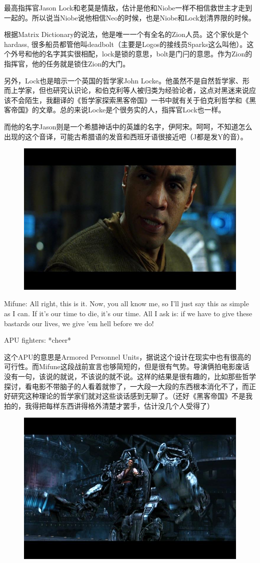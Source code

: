 \documentclass[UTF8]{ctexart}
\newenvironment{myquote}{\color{green} \setlength{\leftskip}{6em} \setlength{\rightskip}{4em} \setlength{\parindent}{-2em}}{\par}
\begin{document}
最高指挥官Jason Lock和老莫是情敌，估计是他和Niobe一样不相信救世主才走到一起的。所以说当Niobe说他相信Neo的时候，也是Niobe和Lock划清界限的时候。

根据Matrix Dictionary的说法，他是唯一一个有全名的Zion人员。这个家伙是个hardass, 很多船员都管他叫deadbolt（主要是Logos的接线员Sparks这么叫他）。这个外号和他的名字其实很相配，lock是锁的意思，bolt是门闩的意思。作为Zion的指挥官，他的任务就是锁住Zion的大门。

另外，Lock也是暗示一个英国的哲学家John Locke。他虽然不是自然哲学家、形而上学家，但也研究认识论，和伯克利等人被归类为经验论者，这点对黑迷来说应该不会陌生，我翻译的《哲学家探索黑客帝国》一书中就有关于伯克利哲学和《黑客帝国》的文章。总的来说Locke是个很务实的人，指挥官Lock也一样。

而他的名字Jason则是一个希腊神话中的英雄的名字，伊阿宋。呵呵，不知道怎么出现的这个音译，可能古希腊语的发音和西班牙语很接近吧（J都是发Y的音）。

\begin{figure}[htb]
\centering
\includegraphics[width=0.5\linewidth]{fig/5fe264383ee43a2397ddd8f2.jpg}
\end{figure}

\begin{myquote}
Mifune: All right, this is it. Now, you all know me, so I'll just say this as simple as I can. If it's our time to die, it's our time. All I ask is: if we have to give these bastards our lives, we give 'em hell before we do!

APU fighters: *cheer*
\end{myquote}

这个APU的意思是Armored Personnel Units，据说这个设计在现实中也有很高的可行性。而Mifune这段战前宣言也够简短的，但是很有气势。导演俩拍电影废话没有一句，该说的就说，不该说的就不说。这样的结果是很有趣的，比如那些哲学探讨，看电影不带脑子的人看着就惨了，一大段一大段的东西根本消化不了，而正好研究这种理论的哲学家们就对这些谈话感到无聊了。（还好《黑客帝国》不是我拍的，我得把每样东西讲得格外清楚才罢手，估计没几个人受得了）

\begin{figure}[htb]
\centering
\includegraphics[width=0.5\linewidth]{fig/385658828a847ba20cf4d2f2.jpg}
\end{figure}
\end{document}
